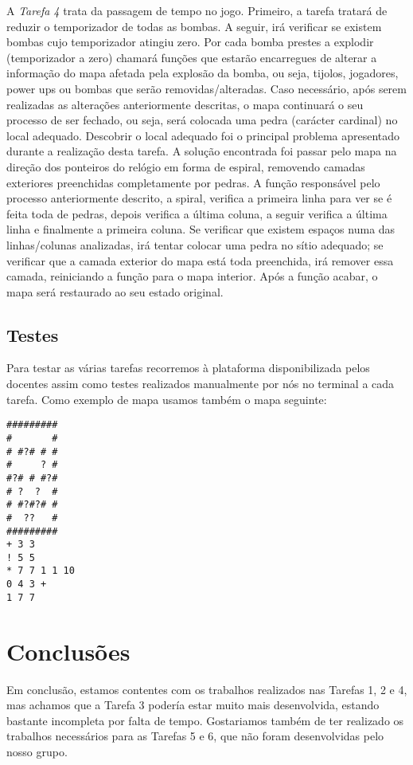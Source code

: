 \documentclass[a4paper]{article}
\begin{document}
A \emph{Tarefa 4} trata da passagem de tempo no jogo. Primeiro, a
tarefa tratará de reduzir o temporizador de todas as bombas. A seguir, 
irá verificar se existem bombas cujo temporizador atingiu zero. Por 
cada bomba prestes a explodir (temporizador a zero) chamará funções 
que estarão encarregues de alterar a informação do mapa afetada pela 
explosão da bomba, ou seja, tijolos, jogadores, power ups ou bombas 
que serão removidas/alteradas. Caso necessário, após serem realizadas
as alterações anteriormente descritas, o mapa continuará o seu processo
de ser fechado, ou seja, será colocada uma pedra (carácter cardinal)
no local adequado. Descobrir o local adequado foi o principal problema 
apresentado durante a realização desta tarefa. A solução encontrada foi
passar pelo mapa na direção dos ponteiros do relógio em forma de espiral,
removendo camadas exteriores preenchidas completamente por pedras. 
A função responsável pelo processo anteriormente descrito, a spiral, 
verifica a primeira linha para ver se é feita toda de pedras, depois verifica
a última coluna, a seguir verifica a última linha e finalmente a primeira 
coluna. Se verificar que existem espaços numa das linhas/colunas analizadas,
irá tentar colocar uma pedra no sítio adequado; se verificar que a
camada exterior do mapa está toda preenchida, irá remover essa camada, 
reiniciando a função para o mapa interior. Após a função acabar, 
o mapa será restaurado ao seu estado original.

\subsection{Testes}

Para testar as várias tarefas recorremos à plataforma disponibilizada 
pelos docentes assim como testes realizados manualmente por nós 
no terminal a cada tarefa. Como exemplo de mapa usamos também o 
mapa seguinte:
\begin{verbatim}
#########
#       #
# #?# # #
#     ? #
#?# # #?#
# ?  ?  #
# #?#?# #
#  ??   #
#########
+ 3 3
! 5 5
* 7 7 1 1 10
0 4 3 +
1 7 7
\end{verbatim}

\section{Conclusões}
\label{sec:conclusao}

Em conclusão, estamos contentes com os trabalhos realizados nas Tarefas
1, 2 e 4, mas achamos que a Tarefa 3 podería estar muito mais desenvolvida, 
estando bastante incompleta por falta de tempo. Gostariamos também de 
ter realizado os trabalhos necessários para as Tarefas 5 e 6, que não 
foram desenvolvidas pelo nosso grupo.
\end{document}
